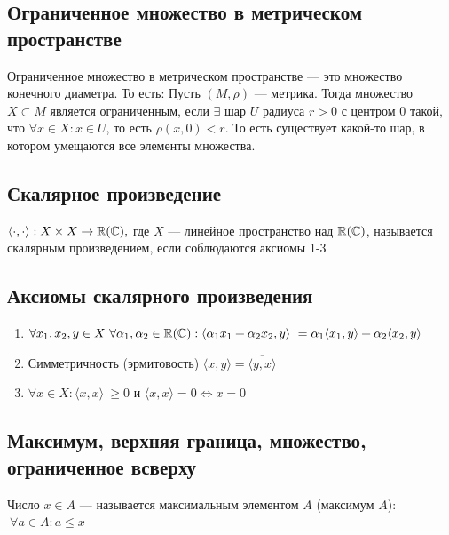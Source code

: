 \newpage
\subsection{Ограниченное множество в метрическом пространстве}
    \begin{definition}
        Ограниченное множество в метрическом пространстве --- это множество конечного диаметра. То есть:
        \newline
        \newline
        Пусть $(M, \rho)$ --- метрика. Тогда множество $X \subset M$ является ограниченным, если $\exists$ шар $U$ радиуса $r > 0$ с центром 
        0 такой, что $\forall x \in X : x \in U$, то есть $\rho(x, 0) < r$. То есть существует какой-то шар, в котором умещаются все элементы множества.
    \end{definition}

\newpage
{}
\subsection{Скалярное произведение}

	\begin{definition}
		$ \langle \cdot, \cdot \rangle: X \times X \to \operatorname*{\mathbb{R}} (\mathbb{C}), $ где $X$ --- линейное пространство над $ \operatorname*{\mathbb{R}} (\mathbb{C}) $, называется скалярным произведением, если соблюдаются аксиомы 1-3 
	\end{definition}
	
	\subsection*{Аксиомы скалярного произведения}
	
	\begin{enumerate}
		\item $ \forall x_1, x_2, y \in X \ \forall \alpha_1, \alpha_2 \in \operatorname*{\mathbb{R}} (\mathbb{C}) : \langle \alpha_1 x_1 + \alpha_2 x_2, y\rangle \  = \alpha_1 \langle x_1, y \rangle  + \alpha_2 \langle x_2, y \rangle $
		\item Симметричность (эрмитовость) $ \langle x,y \rangle  = \overline{\langle y, x \rangle } $
		\item $ \forall x \in X : \langle x,x \rangle  \ \ge 0  $ и $ \langle x,x \rangle  = 0 \Leftrightarrow x = 0 $
	\end{enumerate}
\newpage
\subsection{Максимум, верхняя граница, множество, ограниченное всверху}
	\begin{definition}
		Число $x \in A$ --- называется максимальным элементом $A$ (максимум $A$): $\ \forall a \in A : a \le x $
	\end{definition}
	
